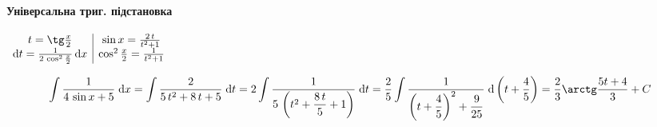 \documentclass[../rgr1.tex]{subfiles}
\begin{document}
\Solution

\paragraph{Універсальна триг. підстановка}
\begin{varwidth}{1in}
	\fbox
{
	$\begin{array}{c|c}t=\tg\frac{x}{2}&\sin x=\frac{2\,t}{{t}^{2}+1}\\\mathrm{d}t=\frac{1}{2\,\cos^{2}\frac{x}{2}}\,\mathrm{d}x&\cos^{2}\frac{x}{2}=\frac{1}{{t}^{2}+1}\end{array}$
}
\end{varwidth}
\begin{dmath}
	\int{\frac{1}{4\,\sin x+5}}{\;\mathrm{d}x}
	=\int{\dfrac{2}{5\,{t}^{2}+8\,t+5}}{\;\mathrm{d}t}
	=2\int{\dfrac{1}{5\,\left({t}^{2}+\dfrac{8\,t}{5}+1\right)}}{\;\mathrm{d}t}
	=\dfrac{2}{5}\int{\dfrac{1}{\left({t+\dfrac{4}{5}}\right)^{2}+\dfrac{9}{25}}}{\;\mathrm{d}\left(t+\frac{4}{5}\right)}
	=\dfrac{2}{3}\arctg\frac{5t+4}{3}+C
\end{dmath}

\end{document}
